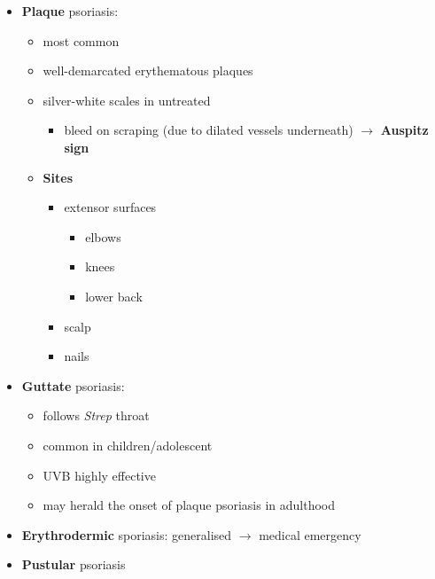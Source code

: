\documentclass[
  12pt,
]{memoir}
\providecommand{\tightlist}{%
  \setlength{\itemsep}{0pt}\setlength{\parskip}{0pt}}
\begin{document}
\begin{itemize}
\tightlist
\item
  \textbf{Plaque} psoriasis:

  \begin{itemize}
  \tightlist
  \item
    most common
  \item
    well-demarcated erythematous plaques
  \item
    silver-white scales in untreated

    \begin{itemize}
    \tightlist
    \item
      bleed on scraping (due to dilated vessels underneath)
      \(\rightarrow\) \textbf{Auspitz sign}
    \end{itemize}
  \item
    \textbf{Sites}

    \begin{itemize}
    \tightlist
    \item
      extensor surfaces

      \begin{itemize}
      \tightlist
      \item
        elbows
      \item
        knees
      \item
        lower back
      \end{itemize}
    \item
      scalp
    \item
      nails
    \end{itemize}
  \end{itemize}
\item
  \textbf{Guttate} psoriasis:

  \begin{itemize}
  \tightlist
  \item
    follows \emph{Strep} throat
  \item
    common in children/adolescent
  \item
    UVB highly effective
  \item
    may herald the onset of plaque psoriasis in adulthood
  \end{itemize}
\item
  \textbf{Erythrodermic} sporiasis: generalised \(\rightarrow\) medical
  emergency
\item
  \textbf{Pustular} psoriasis
\end{itemize}

\pagebreak
\end{document}
